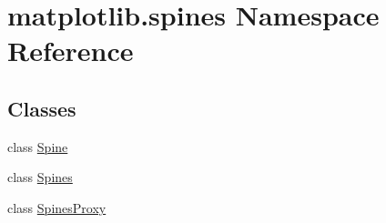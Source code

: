 \hypertarget{namespacematplotlib_1_1spines}{}\section{matplotlib.\+spines Namespace Reference}
\label{namespacematplotlib_1_1spines}
\subsection*{Classes}
\begin{DoxyCompactItemize}
\item 
class \hyperlink{classmatplotlib_1_1spines_1_1Spine}{Spine}
\item 
class \hyperlink{classmatplotlib_1_1spines_1_1Spines}{Spines}
\item 
class \hyperlink{classmatplotlib_1_1spines_1_1SpinesProxy}{Spines\+Proxy}
\end{DoxyCompactItemize}
